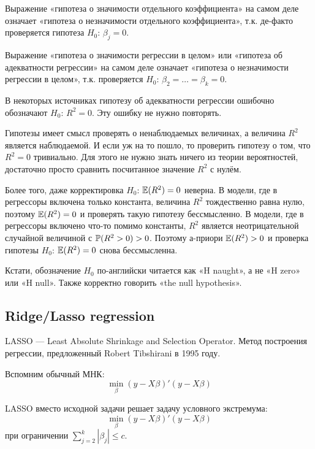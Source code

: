\documentclass[12pt, a4paper]{article}
\begin{document}
Выражение «гипотеза о значимости отдельного коэффициента» на самом деле означает «гипотеза о незначимости отдельного коэффициента», т.к. де-факто проверяется гипотеза $H_0$: $\beta_j=0$.

Выражение «гипотеза о значимости регрессии в целом» или «гипотеза об адекватности регрессии» на самом деле означает «гипотеза о незначимости регрессии в целом», т.к. проверяется $H_0$: $\beta_2=\ldots=\beta_k=0$.

В некоторых источниках гипотезу об адекватности регрессии ошибочно обозначают $H_0$: $R^2=0$. Эту ошибку не нужно повторять.

Гипотезы имеет смысл проверять о ненаблюдаемых величинах, а величина $R^2$ является наблюдаемой. И если уж на то пошло, то проверить гипотезу о том, что $R^2=0$ тривиально. Для этого не нужно знать ничего из теории вероятностей, достаточно просто сравнить посчитанное значение $R^2$ с нулём.

Более того, даже корректировка $H_0$: $\E(R^2)=0$ неверна. В модели, где в регрессоры включена только константа, величина $R^2$ тождественно равна нулю, поэтому $\E(R^2)=0$ и проверять такую гипотезу бессмысленно. В модели, где в регрессоры включено что-то помимо константы, $R^2$ является неотрицательной случайной величиной с $\P(R^2>0)>0$. Поэтому а-приори $\E(R^2)>0$ и проверка гипотезы $H_0$: $\E(R^2)=0$ снова бессмысленна.

Кстати, обозначение $H_0$ по-английски читается как «H naught», а не «H zero» или «H null». Также корректно говорить «the null hypothesis».


\subsection{Ridge/Lasso regression}

LASSO — Least Absolute Shrinkage and Selection Operator. Метод построения регрессии, предложенный Robert Tibshirani в 1995 году.

Вспомним обычный МНК:
\begin{equation}
\min_{\beta} (y-X\beta)'(y-X\beta)
\end{equation}


LASSO вместо исходной задачи решает задачу условного экстремума:
\begin{equation}
\min_{\beta} (y-X\beta)'(y-X\beta)
\end{equation}
при ограничении $\sum_{j=2}^{k}|\beta_j|\leq c$.

\end{document}
